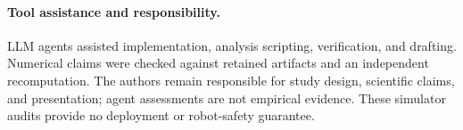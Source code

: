 \paragraph{Tool assistance and responsibility.}
LLM agents assisted implementation, analysis scripting, verification, and
drafting. Numerical claims were checked against retained artifacts and an
independent recomputation. The authors remain responsible for study design,
scientific claims, and presentation; agent assessments are not empirical
evidence. These simulator audits provide no deployment or robot-safety guarantee.
